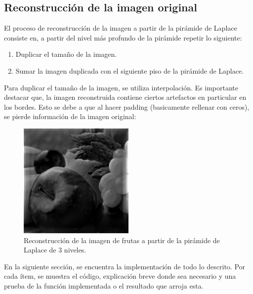 \documentclass[12pt, letterpaper]{article}
\begin{document}
\subsection{Reconstrucción de la imagen original}
El proceso de reconstrucción de la imagen a partir de la pirámide de Laplace consiste en, a partir del nivel más profundo de la pirámide repetir lo siguiente:
\begin{enumerate}
  \item Duplicar el tamaño de la imagen.
  \item Sumar la imagen duplicada con el siguiente piso de la pirámide de Laplace. 
\end{enumerate}

\par Para duplicar el tamaño de la imagen, se utiliza interpolación. Es importante destacar que, la imagen reconstruida contiene ciertos artefactos en particular en los bordes. Esto se debe a que al hacer padding (basicamente rellenar con ceros), se pierde información de la imagen original: 


\begin{figure}[H]
  \centering
  \includegraphics[width = 0.5\textwidth]{frutas_recons.png}  
  \caption{Reconstrucción de la imagen de frutas a partir de la pirámide de Laplace de 3 niveles.}
  \label{fig:frutasRec}
\end{figure}


\bigskip
\bigskip
\bigskip
\bigskip
\bigskip
\bigskip
\par En la siguiente sección, se encuentra la implementación de todo lo descrito.  Por cada ítem, se muestra el código, explicación breve donde sea necesario y una prueba de la función implementada o el resultado que arroja esta. 
 
\end{document}
